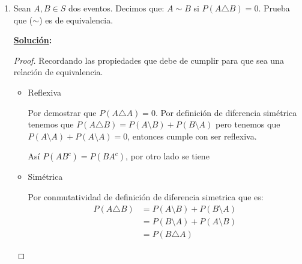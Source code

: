 \documentclass[11pt,letterpaper]{report}
\newcommand{\sol}{\textbf{\underline{Solución}: }} %
\begin{document}
\begin{enumerate}
\textit{Hint}: Usa la Desigualdad de Boole

\sol \begin{proof}
    Recordando la desigualdad de Boole que es:
    \[
        P(\bigcup_{i=1}^{\infty} A_i) \leq \sum_{i=1}^{\infty} P(A_i)
    \]
\begin{align*}
    P(\bigcap_{i=0}^{\infty} A_i)
        &= 1 - (P(\bigcap_{i=1}^{\infty} A_i)^c) && \text{(Def. complemento)}\\
        &= 1 - P(\bigcup_{i=1}^{\infty} A_i^c) && \text{(De Morgan)}\\
        &\geq 1 - \sum_{i=1}^{\infty} P(A_i^c) && \text{(Desigualdad de Boole)}\\
        &\geq 1 - \sum_{i=1}^{\infty} (1 - P(A_i)) && \text{(Def. complemento)}\\
        &\geq 1 - \sum_{i=1}^{\infty} (1 - 1) && \text{(Por hipótesis)}\\
        &\geq 1 - \sum_{i=1}^{\infty} 0 && \text{(Aritmética)}\\
        &= 1
\end{align*}
\end{proof}

\item Sean $A,B \in S$ dos eventos. Decimos que: $A \sim B$ si $P(A \triangle B) = 0$.
Prueba que ($\sim$) es de equivalencia.

\sol
\begin{proof}
    Recordando las propiedades que debe de cumplir para que sea una relación de equivalencia.
    \begin{itemize}
    \item Reflexiva
    
    Por demostrar que $P(A \triangle A) = 0$. Por definición de diferencia simétrica tenemos que
    $P(A \triangle B) = P(A \setminus B) + P(B \setminus A)$ pero tenemos que
    $P(A \setminus A) + P(A \setminus A) = 0$, entonces cumple con ser reflexiva.
    
    Así $P(AB^c) = P(BA^c)$, por otro lado se tiene 

    \item Simétrica
    
    Por conmutatividad de definición de diferencia simetrica que es:
    \begin{align*}
        P(A \triangle B) 
            &= P(A \setminus B) + P(B \setminus A)\\
            &= P(B \setminus A) + P(A \setminus B)\\
            &= P(B \triangle A)
    \end{align*}


\end{itemize}
\end{proof}
\end{enumerate}
\end{document}
